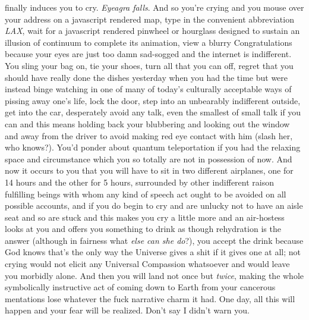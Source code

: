 \documentclass{article}
\begin{document}
finally induces you to cry. \textit{Eyeagra falls}. And so
you're crying and you mouse over your address on a javascript rendered
map, type in the convenient abbreviation \textit{LAX}, wait for
a javascript rendered pinwheel or hourglass designed to sustain an
illusion of continuum to complete its animation, view a blurry
Congratulations because your eyes are just too damn sad-sogged and the
internet is indifferent. You sling your bag on, tie your shoes, turn all
that you can off, regret that you should have really done the dishes
yesterday when you had the time but were instead binge watching in one
of many of today's culturally acceptable ways of pissing away one's
life, lock the door, step into an unbearably indifferent outside, get
into the car, desperately avoid any talk, even the smallest of small
talk if you can and this means holding back your blubbering and looking
out the window and away from the driver to avoid making red eye contact
with him (slash her, who knows?). You'd ponder about quantum
teleportation if you had the relaxing space and circumstance which you
so totally are not in possession of now. And now it occurs to you that
you will have to sit in two different airplanes, one for 14 hours and
the other for 5 hours, surrounded by other indifferent raison fulfilling
beings with whom any kind of speech act ought to be avoided on all
possible accounts, and if you do begin to cry and are unlucky not to
have an aisle seat and so are stuck and this makes you cry a little more
and an air-hostess looks at you and offers you something to drink as
though rehydration is the answer (although in fairness what \textit{else
can she do}?), you accept the drink because God knows that's the only
way the Universe gives a shit if it gives one at all; not crying would
not elicit any Universal Compassion whatsoever and would leave you
morbidly alone. And then you will land not once but \textit{twice},
making the whole symbolically instructive act of coming down to Earth
from your cancerous mentations lose whatever the fuck narrative charm it
had. One day, all this will happen and your fear will be realized. Don't
say I didn't warn you.
\end{document}
